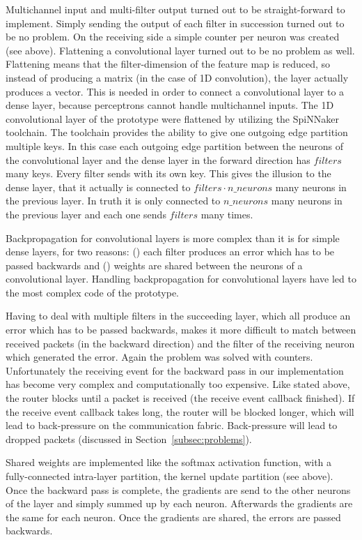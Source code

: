 \documentclass[]{article}
\begin{document}
Multichannel input and multi-filter output turned out to be
straight-forward to implement.
Simply sending the output of each filter in succession turned out to
be no problem.
On the receiving side a simple counter per neuron was created
(see above).
Flattening a convolutional layer turned out to be no problem as well.
Flattening means that the filter-dimension of the feature map is
reduced, so instead of producing a matrix (in the case of 1D
convolution), the layer actually produces a vector.
This is needed in order to connect a convolutional layer to a dense
layer, because perceptrons cannot handle multichannel inputs.
The 1D convolutional layer of the prototype were flattened by
utilizing the SpiNNaker toolchain.
The toolchain provides the ability to give one outgoing edge partition
multiple keys.
In this case each outgoing edge partition between the neurons of the
convolutional layer and the dense layer in the forward direction has
$filters$ many keys.
Every filter sends with its own key.
This gives the illusion to the dense layer, that it actually is
connected to $filters \cdot n\_neurons$ many neurons in the previous
layer.
In truth it is only connected to $n\_neurons$ many neurons in the
previous layer and each one sends $filters$ many times.

Backpropagation for convolutional layers is more complex than it is
for simple dense layers, for two reasons: () each
filter produces an error which has to be passed backwards and
() weights are shared between the neurons of a
convolutional layer.
Handling backpropagation for convolutional layers have led to the
most complex code of the prototype.

Having to deal with multiple filters in the succeeding layer, which
all produce an error which has to be passed backwards, makes it more
difficult to match between received packets (in the backward
direction) and the filter of the receiving neuron which generated the
error.
Again the problem was solved with counters.
Unfortunately the receiving event for the backward pass in our
implementation has become very complex and computationally too
expensive.
Like stated above, the router blocks until a packet is received
(the receive event callback finished).
If the receive event callback takes long, the router will be blocked
longer, which will lead to back-pressure on the communication
fabric.
Back-pressure will lead to dropped packets (discussed in
Section~\ref{subsec:problems}).

Shared weights are implemented like the softmax activation function,
with a fully-connected intra-layer partition, the kernel update
partition (see above).
Once the backward pass is complete, the gradients are send to the
other neurons of the layer and simply summed up by each neuron.
Afterwards the gradients are the same for each neuron.
Once the gradients are shared, the errors are passed backwards.
\end{document}
